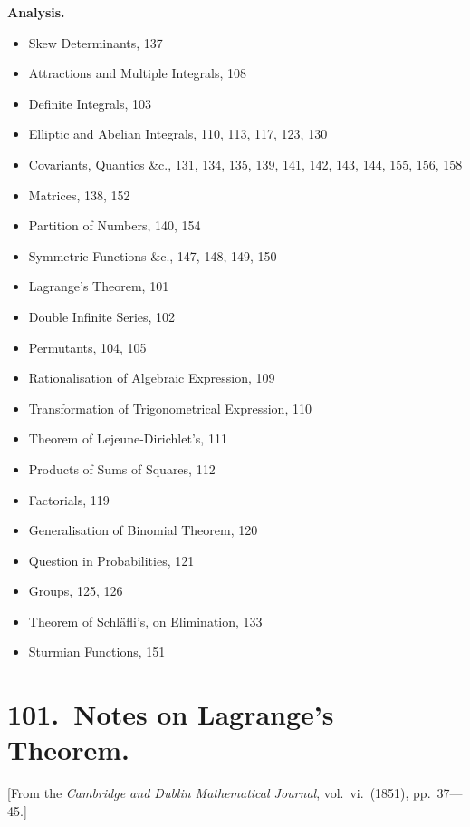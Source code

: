 \documentclass[11pt]{article}
\begin{document}
\noindent\textbf{Analysis.}
\begin{itemize}\itemsep0pt
\item Skew Determinants, 137
\item Attractions and Multiple Integrals, 108
\item Definite Integrals, 103
\item Elliptic and Abelian Integrals, 110, 113, 117, 123, 130
\item Covariants, Quantics \&c., 131, 134, 135, 139, 141, 142, 143, 144, 155, 156, 158
\item Matrices, 138, 152
\item Partition of Numbers, 140, 154
\item Symmetric Functions \&c., 147, 148, 149, 150
\item Lagrange's Theorem, 101
\item Double Infinite Series, 102
\item Permutants, 104, 105
\item Rationalisation of Algebraic Expression, 109
\item Transformation of Trigonometrical Expression, 110
\item Theorem of Lejeune-Dirichlet's, 111
\item Products of Sums of Squares, 112
\item Factorials, 119
\item Generalisation of Binomial Theorem, 120
\item Question in Probabilities, 121
\item Groups, 125, 126
\item Theorem of Schl\"{a}fli's, on Elimination, 133
\item Sturmian Functions, 151
\end{itemize}
\clearpage


\section*{101.\ Notes on Lagrange's Theorem.}

\begin{center}\small
[From the \emph{Cambridge and Dublin Mathematical Journal}, vol.\ vi.\ (1851), pp.\ 37---45.]
\end{center}
\end{document}
